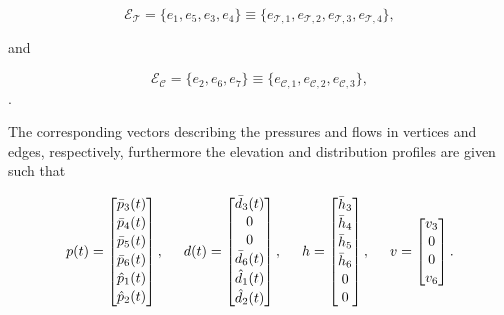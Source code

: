 \begin{equation}
  \label{edgeorientation_example1_T}
  \mathcal{E}_{\mathcal{T}} = \{ e_1, e_5, e_3, e_4 \} \equiv \{ e_{\mathcal{T},1}, e_{\mathcal{T},2}, e_{\mathcal{T},3}, e_{\mathcal{T},4}  \},
\end{equation}

and

\begin{equation}
\label{edgeorientation_example1_C}
  \mathcal{E}_\mathcal{C} = \{e_2, e_6, e_7\} \equiv \{e_{\mathcal{C},1}, e_{\mathcal{C},2}, e_{\mathcal{C},3}\},
\end{equation}.

The corresponding vectors describing the pressures and flows in vertices and edges, respectively, furthermore the elevation and distribution profiles are given such that

\begin{equation}
\label{example1_signals_constants}
p(t) =
 \begin{bmatrix} 
 \bar{p}_3(t) \\[1.3pt] 
 \bar{p}_4(t) \\[1.3pt]
 \bar{p}_5(t) \\[1.3pt] 
 \bar{p}_6(t) \\[1.3pt] 
 \hat{p}_1(t) \\[1.3pt] 
 \hat{p}_2(t) \\[1.3pt] 
 \end{bmatrix}
 , \hspace{5mm}
 d(t) =  \begin{bmatrix} 
 \bar{d}_3(t) \\[1pt] 
 0 \\[1pt]
 0 \\[1pt] 
 \bar{d}_6(t) \\[1pt] 
 \hat{d}_1(t) \\[1pt] 
 \hat{d}_2(t) \\[1pt] 
 \end{bmatrix}
 , \hspace{5mm}
 h =  \begin{bmatrix} 
 \bar{h}_3 \\[1pt] 
 \bar{h}_4 \\[1pt]
 \bar{h}_5 \\[1pt] 
 \bar{h}_6 \\[1pt] 
 0 \\[1pt] 
 0 \\[1pt] 
 \end{bmatrix}
 , \hspace{5mm}
 v =  \begin{bmatrix} 
 v_3 \\[1pt] 
 0 \\[1pt]
 0 \\[1pt] 
 v_6 \\[1pt]
 \end{bmatrix}.
\end{equation}

